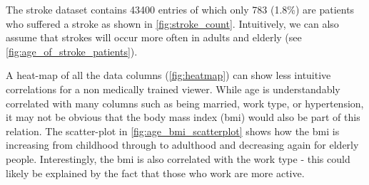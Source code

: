 \documentclass[proposal]{softeng}
\begin{document}
The stroke dataset contains 43400 entries of which only 783 (1.8\%) are patients who suffered a stroke as shown in \ref{fig:stroke_count}. Intuitively, we can also assume that strokes will occur more often in adults and elderly (see \ref{fig:age_of_stroke_patients}).

\begin{figure}
    \centering
    \label{activation_funtions}
\end{figure}

A heat-map of all the data columns (\ref{fig:heatmap}) can show less intuitive correlations for a non medically trained viewer. While age is understandably correlated with many columns such as being married, work type, or hypertension, it may not be obvious that the body mass index (bmi) would also be part of this relation. The scatter-plot in \ref{fig:age_bmi_scatterplot} shows how the bmi is increasing from childhood through to adulthood and decreasing again for elderly people. Interestingly, the bmi is also correlated with the work type - this could likely be explained by the fact that those who work are more active.
\end{document}
